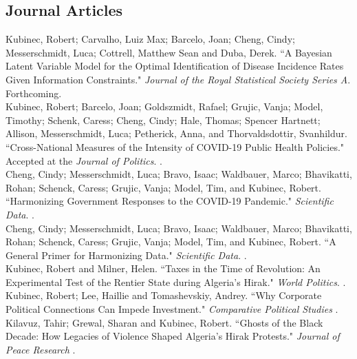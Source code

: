 \documentclass[11pt, a4paper]{article}
\newcommand{\years}[1]{\marginnote{\scriptsize #1}}
\begin{document}
\subsection*{Journal Articles}

\years{2024} Kubinec, Robert; Carvalho, Luiz Max; Barcelo, Joan; Cheng, Cindy; Messerschmidt, Luca; Cottrell, Matthew Sean and Duba, Derek. ``A Bayesian Latent Variable Model for the Optimal Identification of Disease Incidence Rates Given Information Constraints." \emph{Journal of the Royal Statistical Society Series A}. Forthcoming. \\

\years{2024} Kubinec, Robert; Barcelo, Joan; Goldszmidt, Rafael; Grujic, Vanja; Model, Timothy; Schenk, Caress; Cheng, Cindy; Hale, Thomas; Spencer Hartnett; Allison, Messerschmidt, Luca; Petherick, Anna, and Thorvaldsdottir, Svanhildur. ``Cross-National Measures of the Intensity of COVID-19 Public Health Policies." Accepted at the \emph{Journal of Politics}. .\\

\years{2024} Cheng, Cindy; Messerschmidt, Luca; Bravo, Isaac; Waldbauer, Marco; Bhavikatti, Rohan; Schenck, Caress; Grujic, Vanja; Model, Tim, and Kubinec, Robert. ``Harmonizing Government Responses to the COVID-19 Pandemic." \emph{Scientific Data}. .\\

\years{2023} Cheng, Cindy; Messerschmidt, Luca; Bravo, Isaac; Waldbauer, Marco; Bhavikatti, Rohan; Schenck, Caress; Grujic, Vanja; Model, Tim, and Kubinec, Robert. ``A General Primer for Harmonizing Data." \emph{Scientific Data}. .\\

\years{2023} Kubinec, Robert and Milner, Helen. ``Taxes in the Time of Revolution: An Experimental Test of the Rentier State during Algeria's Hirak." \emph{World Politics}. .\\

\years{2023} Kubinec, Robert; Lee, Haillie and Tomashevskiy, Andrey. ``Why Corporate Political Connections Can Impede Investment." \emph{Comparative Political Studies} .\\

\years{2022} Kilavuz, Tahir; Grewal, Sharan and Kubinec, Robert. ``Ghosts of the Black Decade: How Legacies of Violence Shaped Algeria's Hirak Protests." \emph{Journal of Peace Research} .\\
\end{document}
